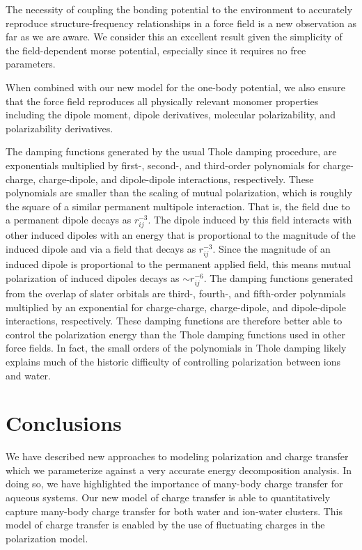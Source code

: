 \documentclass[journal=jctcce,manuscript=article]{achemso}
\begin{document}
The necessity of coupling the bonding potential to the environment to accurately reproduce structure-frequency relationships in a force field is a new observation as far as we are aware. We consider this an excellent result given the simplicity of the field-dependent morse potential, especially since it requires no free parameters. 

When combined with our new model for the one-body potential, we also ensure that the force field reproduces all physically relevant monomer properties including the dipole moment, dipole derivatives,
molecular polarizability, and polarizability derivatives. 

The damping functions generated by the usual Thole damping procedure\cite{thole1981molecular},
are exponentials multiplied by first-, second-, and third-order polynomials
for charge-charge, charge-dipole, and dipole-dipole interactions, respectively.\cite{thole1981molecular}
These polynomials are smaller than the scaling of mutual polarization, which is roughly the square
of a similar permanent multipole interaction. That is, the field due to a permanent dipole
decays as $r_{ij}^{-3}$. The dipole induced by this field interacts with other induced dipoles
with an energy that is proportional to the magnitude of the induced dipole and via a field
that decays as $r_{ij}^{-3}$. Since the magnitude of an induced dipole is proportional to
the permanent applied field, this means mutual polarization of induced dipoles decays as $\sim$$r_{ij}^{-6}$. The damping functions generated from the overlap of slater orbitals are
third-, fourth-, and fifth-order polynmials multiplied by an exponential for charge-charge, charge-dipole,
and dipole-dipole interactions, respectively. These damping functions are therefore better able
to control the polarization energy than the Thole damping functions used in other force fields.
In fact, the small orders of the polynomials in Thole damping likely explains much of the historic difficulty of controlling
polarization between ions and water.\cite{jiao2006simulation,mason2012accurate}


\section*{Conclusions}

We have described new approaches to modeling polarization and charge transfer which we parameterize against a very accurate energy decomposition analysis. In doing so, we have highlighted the importance of many-body charge transfer for aqueous systems. Our new model of charge transfer is able to quantitatively capture many-body charge transfer for both water and ion-water clusters. This model of charge transfer is enabled by the use of fluctuating charges in the polarization model.
\end{document}
